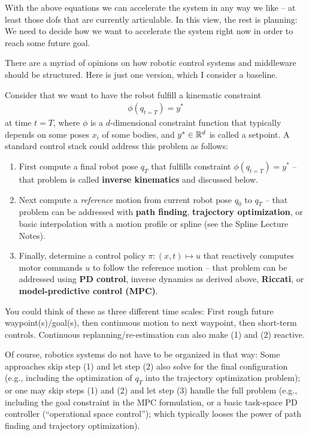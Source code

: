 With the above equations we can accelerate the system in any way we
like -- at least those dofs that are currently articulable. In this
view, the rest is planning: We need to decide how we want to
accelerate the system right now in order to reach some future goal.

There are a myriad of opinions on how robotic control systems and middleware
should be structured. Here is just one version, which I consider a baseline.

Consider that we want to have the robot fulfill a kinematic constraint
\begin{align}
\phi(q_{t=T}) = y^*
\end{align}
at time $t=T$, where $\phi$ is a $d$-dimensional
constraint function that typically depends on some poses $x_i$ of some bodies,
and $y^*\in{\mathbb{R}}^d$ is called a setpoint. A standard control stack
could address this problem as follows:
\begin{enumerate}
  \item First compute a final robot pose $q_T$ that fulfills constraint 
    $\phi(q_{t=T}) = y^*$ -- that problem is called \textbf{inverse
    kinematics} and discussed below.
  \item Next compute a \emph{reference} motion from current robot pose
    $q_0$ to $q_T$ -- that problem can be addressed with \textbf{path
    finding}, \textbf{trajectory optimization}, or basic interpolation
    with a motion profile or spline (see the Spline Lecture Notes).
  \item Finally, determine a control policy $\pi: (x,t) \mapsto u$
    that reactively computes motor commands $u$ to follow the
    reference motion -- that problem can be addressed using \textbf{PD
    control}, inverse dynamics as derived above, \textbf{Riccati},
    or \textbf{model-predictive control (MPC)}.
\end{enumerate}
You could think of these as three different time scales: First rough
future waypoint(s)/goal(s), then continuous motion to next waypoint,
then short-term controls. Continuous replanning/re-estimation can also make (1) and (2) reactive.

Of course, robotics systems do not have to be organized in that
way: Some approaches skip step (1) and let step (2) also solve for the
final configuration (e.g., including the optimization of $q_T$ into
the trajectory optimization problem); or one may skip steps (1) and
(2) and let step (3) handle the full problem (e.g., including the goal
constraint in the MPC formulation, or a basic task-space PD controller
(``operational space control''); which typically looses the power of
path finding and trajectory optimization).


